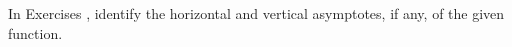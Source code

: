 {\noindent In Exercises}
{, identify the horizontal and vertical asymptotes, if any, of the given function.
}
